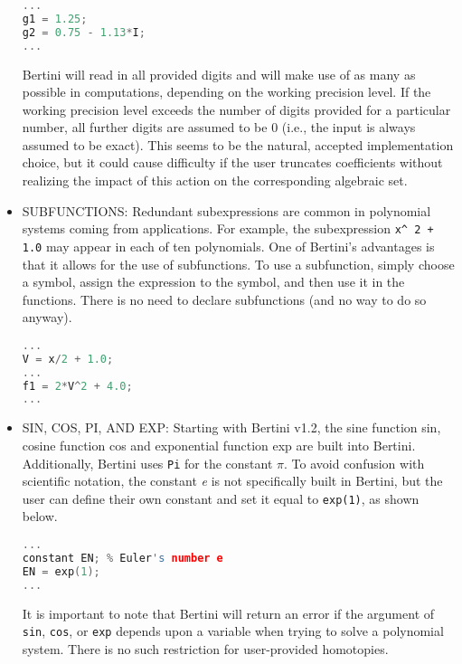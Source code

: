 \begin{itemize}
\begin{center}
\begin{minipage}{0.9\linewidth}
\begin{lstlisting}[language=c++, caption=Adapted from \cite{BM13}, captionpos=b]
...
g1 = 1.25;
g2 = 0.75 - 1.13*I;
...
\end{lstlisting}
\end{minipage}\end{center}

Bertini will read in all provided digits and will make use of as many as possible in computations, depending on the working precision level. If the working precision level exceeds the number of digits provided for a particular number, all further digits are assumed to be
 0 (i.e., the input is always assumed to be exact). This seems to be the natural, accepted implementation choice, but it could cause difficulty if the user truncates coefficients without realizing the impact of this action on the corresponding algebraic set.

\item{SUBFUNCTIONS:}
Redundant subexpressions are common in polynomial systems coming from applications. For example, the subexpression \texttt{x\string^ 2 + 1.0} may appear in each of ten polynomials. One of Bertini’s advantages is that it allows for the use of subfunctions. To use a subfunction, simply choose a symbol, assign the expression to the symbol, and then use it in the functions. There is no need to declare subfunctions (and no way to do so anyway).

\begin{center}\begin{minipage}{0.9\linewidth}
\begin{lstlisting}[language=c++, caption=Adapted from \cite{BM13}, captionpos=b]
...
V = x/2 + 1.0;
...
f1 = 2*V^2 + 4.0;
...
\end{lstlisting}
\end{minipage}\end{center}

\item{SIN, COS, PI, AND EXP:}
Starting with Bertini v1.2, the sine function sin, cosine function cos and exponential function exp are built into Bertini. Additionally, Bertini uses \texttt{Pi} for the constant $\pi$. To avoid confusion with scientific notation, the constant \textit{e} is not specifically built in Bertini, but the user can define their own constant and set it equal to \texttt{exp(1)}, as shown below.
\begin{center}\begin{minipage}{0.9\linewidth}

\begin{lstlisting}[language=c++, caption=Adapted from \cite{BM13}, captionpos=b]
...
constant EN; % Euler's number e
EN = exp(1);
...
\end{lstlisting}
\end{minipage}\end{center}

It is important to note that Bertini will return an error if the argument of \texttt{sin}, \texttt{cos}, or \texttt{exp} depends upon a variable when trying to solve a polynomial system. There is no such restriction for user-provided homotopies.
\end{itemize}


